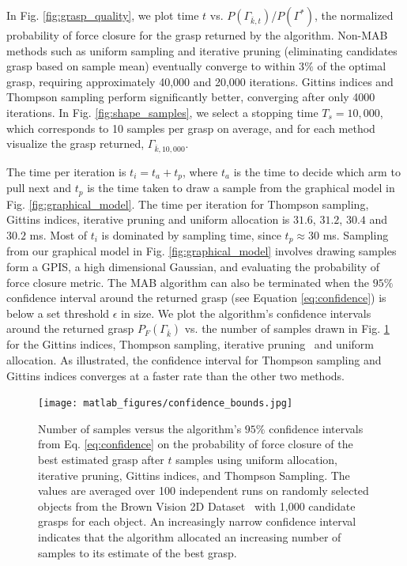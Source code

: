 \documentclass[10pt, conference]{ieeeconf}      %
\begin{document}
In Fig. \ref{fig:grasp_quality}, we plot time $t$ vs. $P(\Gamma_{\bar{k},t})$/$P(\Gamma^*)$, the normalized probability
of force closure for the grasp returned by the algorithm.  Non-MAB methods such as uniform sampling and iterative
pruning (eliminating candidates grasp based on sample mean) eventually converge to within 3$\%$ of the optimal grasp,
requiring approximately 40,000 and 20,000 iterations.  Gittins indices and Thompson sampling  perform significantly
better, converging after only 4000 iterations. In Fig. \ref{fig:shape_samples}, we select a stopping time $T_s=10,000$,
which corresponds to 10 samples per grasp on average, and for each method visualize the grasp returned,
$\Gamma_{\bar{k},10,000}$.

The time per iteration is $t_{i} = t_{a}+t_{p}$, where $t_{a}$ is the time to decide which arm to pull next and $t_{p}$ is the time taken to draw a sample from the graphical model in Fig. \ref{fig:graphical_model}. The time per iteration for Thompson sampling, Gittins indices, iterative pruning and uniform allocation is $31.6$, $31.2$, $30.4$ and $30.2$ ms. Most of $t_{i}$ is dominated by sampling time, since $t_{p} \approx 30$ ms. Sampling from our graphical model in Fig. \ref{fig:graphical_model} involves drawing samples form a GPIS, a high dimensional Gaussian, and evaluating the probability of force closure metric. 
The MAB algorithm can also be terminated when the $95\%$ confidence interval around the returned grasp (see Equation
\ref{eq:confidence}) is below a set threshold $\epsilon$ in size. We plot the algorithm's confidence intervals around the returned grasp $P_F(\Gamma_{\bar{k}})$ vs. the number of samples drawn in Fig. \ref{fig:confidence} for the Gittins indices, Thompson sampling, iterative pruning~\cite{kehoe2012toward} and uniform allocation.  As illustrated, the confidence interval for Thompson sampling and Gittins indices converges at a faster rate than the other two methods. 


\begin{figure}[t!]
\centering
\texttt{[image: matlab\_figures/confidence\_bounds.jpg]}
\caption{ Number of samples versus the algorithm's $95\%$ confidence intervals from Eq. \ref{eq:confidence} on the probability of force closure of the best estimated grasp after $t$ samples using uniform allocation, iterative pruning, Gittins indices, and Thompson Sampling. The values are averaged over 100 independent runs on randomly selected objects from the Brown Vision 2D Dataset~\cite{brown} with 1,000 candidate grasps for each object. An increasingly narrow confidence interval indicates that the algorithm allocated an increasing number of samples to its estimate of the best grasp. }

\vspace*{-15pt}
\label{fig:confidence}
\end{figure}
\end{document}
